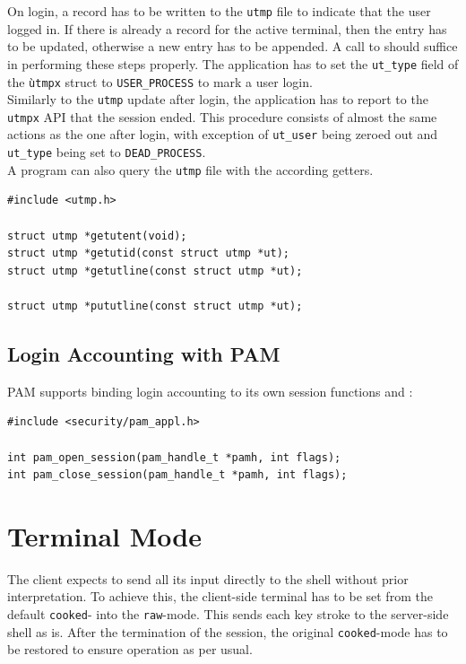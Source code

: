 \documentclass[10pt,a4paper,titlepage,twoside,english,final]{zhawreprt}
\begin{document}
On login, a record has to be written to the \texttt{utmp} file to indicate that the user logged in. If there is already a record for the active \gls{terminal}, then the entry has to be updated, otherwise a new entry has to be appended. A call to \cite{pututxline} should suffice in performing these steps properly. The application has to set the \texttt{ut\_type} field of the \texttt{ùtmpx} struct to \texttt{USER\_PROCESS} to mark a user login.\\
Similarly to the \texttt{utmp} update after login, the application has to report to the \texttt{utmpx} \gls{API} that the session ended. This procedure consists of almost the same actions as the one after login, with exception of \texttt{ut\_user} being zeroed out and \texttt{ut\_type} being set to \texttt{DEAD\_PROCESS}\citep[p.828]{KerriskTLPI}.\\
A program can also query the \texttt{utmp} file with the according getters.
\setlistingC
\begin{lstlisting}[caption={\texttt{utmpx} \gls{API} functions},label=lst:UtmpxApiFunctions]
#include <utmp.h>

struct utmp *getutent(void);
struct utmp *getutid(const struct utmp *ut);
struct utmp *getutline(const struct utmp *ut);

struct utmp *pututline(const struct utmp *ut);
\end{lstlisting}

\subsection{Login Accounting with PAM}\label{ssec:DesignLoginAccountingWithPAM}
\gls{PAM} supports binding login accounting to its own session functions \cite{pam_open_session} and \cite{pam_close_session}:
\setlistingC
\begin{lstlisting}[caption={\gls{PAM} session management},label=lst:PAMSessionManagement]
#include <security/pam_appl.h>

int pam_open_session(pam_handle_t *pamh, int flags);
int pam_close_session(pam_handle_t *pamh, int flags);
\end{lstlisting}

\section{Terminal Mode}\label{sec:DesignTerminalMode}
The client expects to send all its input directly to the \gls{shell} without prior interpretation. To achieve this, the client-side \gls{terminal} has to be set from the default \texttt{cooked}- into the \texttt{raw}-mode\citep[p.1309]{KerriskTLPI}. This sends each key stroke to the server-side \gls{shell} as is. After the termination of the session, the original \texttt{cooked}-mode has to be restored to ensure operation as per usual.
\end{document}

